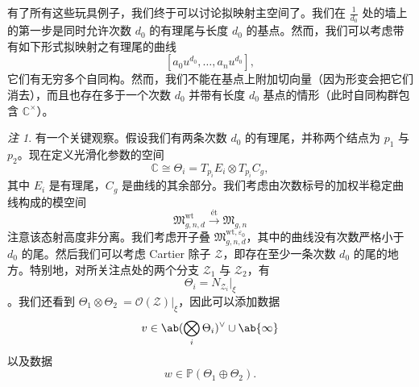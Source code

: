 \documentclass{amsart}
\theoremstyle{definition}
\theoremstyle{remark}
\newtheorem{rmk}[thm]{注}
\theoremstyle{plain}
\theoremstyle{definition}
\theoremstyle{remark}
\newcommand{\C}{\mathbb{C}}
\renewcommand{\P}{\mathbb{P}}
\newcommand{\ep}{\varepsilon}
\newcommand{\mc}[1]{\mathcal{#1}}
\newcommand{\mf}[1]{\mathfrak{#1}}
\newcommand{\mr}[1]{\mathrm{#1}}
\newcommand{\1}{\mathbf{1}}
\newcommand{\2}{\mathbf{2}}
\newcommand{\3}{\mathbf{3}}
\begin{document}
有了所有这些玩具例子，我们终于可以讨论拟映射主空间了。我们在 \(\frac{1}{d_0}\) 处的墙上的第一步是同时允许次数 \(d_0\) 的有理尾与长度 \(d_0\) 的基点。然而，我们可以考虑带有如下形式拟映射之有理尾的曲线
\[ [a_0 u^{d_0}, \ldots, a_n u^{d_0}], \]
它们有无穷多个自同构。然而，我们不能在基点上附加切向量（因为形变会把它们消去），而且也存在多于一个次数 \(d_0\) 并带有长度 \(d_0\) 基点的情形（此时自同构群包含 \(\C^{\times}\)）。

\begin{rmk}
    有一个关键观察。假设我们有两条次数 \(d_0\) 的有理尾，并称两个结点为 \(p_1\) 与 \(p_2\)。现在定义光滑化参数的空间
    \[ \C \cong \Theta_i = T_{p_i} E_i \otimes T_{p_i} C_g, \]
    其中 \(E_i\) 是有理尾，\(C_g\) 是曲线的其余部分。我们考虑由次数标号的加权半稳定曲线构成的模空间
    \[ \mf{M}_{g,n,d}^{\mr{wt}} \xrightarrow{\text{\'et}} \mf{M}_{g,n} \]
    注意该态射高度非分离。我们考虑开子叠 \(\mf{M}_{g,n,d}^{\mr{wt}, \ep_0}\)，其中的曲线没有次数严格小于 \(d_0\) 的尾。然后我们可以考虑 Cartier 除子 \(\mc{Z}\)，即存在至少一条次数 \(d_0\) 的尾的地方。特别地，对所关注点处的两个分支 \(\mc{Z}_1\) 与 \(\mc{Z}_2\)，有
    \[ \Theta_i = N_{\mc{Z}_i} |_{\xi} \]
    。我们还看到 \(\Theta_1 \otimes \Theta_2\ = \mc{O}(\mc{Z})|_{\xi}\)，因此可以添加数据
    \[ v \in \ab(\bigotimes_i \Theta_i)^{\vee} \cup \ab\{\infty\} \]
    以及数据
    \[ w \in \P(\Theta_1 \oplus\Theta_2). \]
\end{rmk}
\end{document}
